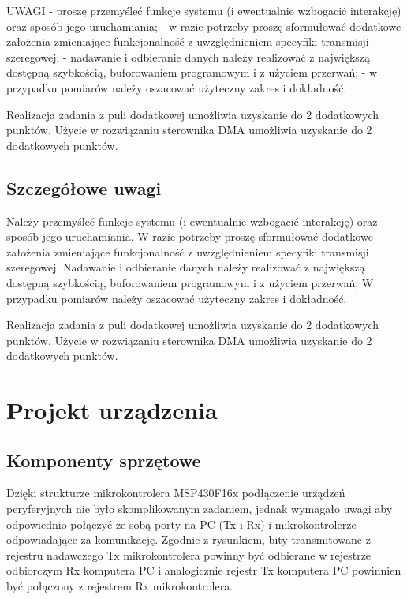 \documentclass[a4paper,titlepage,11pt,floatssmall]{mwrep}
\begin{document}
UWAGI
- proszę przemyśleć funkcje systemu (i ewentualnie wzbogacić interakcję) oraz sposób jego uruchamiania;
- w razie potrzeby proszę sformułować dodatkowe założenia zmieniające funkcjonalność z uwzględnieniem specyfiki transmisji szeregowej;
- nadawanie i odbieranie danych należy realizować z największą dostępną szybkością, buforowaniem programowym i z użyciem przerwań;
- w przypadku pomiarów należy oszacować użyteczny zakres i dokładność. 

Realizacja zadania z puli dodatkowej umożliwia uzyskanie do 2 dodatkowych punktów.
Użycie w rozwiązaniu sterownika DMA umożliwia uzyskanie do 2 dodatkowych punktów.
\section{Szczegółowe uwagi}
Należy przemyśleć funkcje systemu (i ewentualnie wzbogacić interakcję) oraz sposób jego uruchamiania. W razie potrzeby proszę sformułować dodatkowe założenia zmieniające funkcjonalność z uwzględnieniem specyfiki transmisji szeregowej. Nadawanie i odbieranie danych należy realizować z największą dostępną szybkością, buforowaniem programowym i z użyciem przerwań;
W przypadku pomiarów należy oszacować użyteczny zakres i dokładność. 

Realizacja zadania z puli dodatkowej umożliwia uzyskanie do 2 dodatkowych punktów.
Użycie w rozwiązaniu sterownika DMA umożliwia uzyskanie do 2 dodatkowych punktów.


\chapter{Projekt urządzenia}
\section{Komponenty sprzętowe}
Dzięki strukturze mikrokontrolera MSP430F16x podłączenie urządzeń peryferyjnych nie było skomplikowanym zadaniem, jednak wymagało uwagi aby odpowiednio połączyć ze sobą porty na PC (Tx i Rx) i mikrokontrolerze odpowiadające za komunikację. Zgodnie z rysunkiem, bity transmitowane z rejestru nadawczego Tx mikrokontrolera powinny być odbierane w rejestrze odbiorczym Rx komputera PC i analogicznie rejestr Tx komputera PC powinnien być połączony z rejestrem Rx mikrokontrolera.
\end{document}
